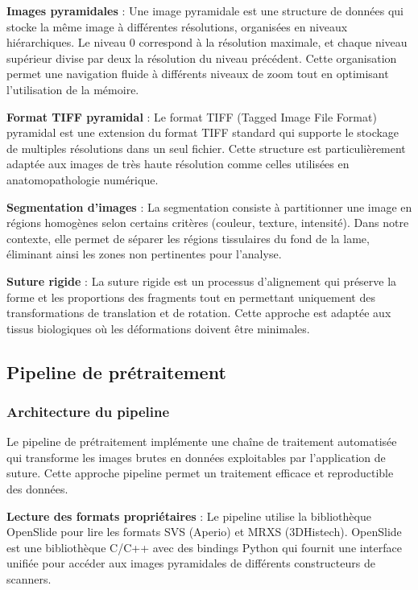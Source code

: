 \documentclass[12pt,a4paper]{report}
\begin{document}
\textbf{Images pyramidales} : Une image pyramidale est une structure de données qui stocke la même image à différentes résolutions, organisées en niveaux hiérarchiques. Le niveau 0 correspond à la résolution maximale, et chaque niveau supérieur divise par deux la résolution du niveau précédent. Cette organisation permet une navigation fluide à différents niveaux de zoom tout en optimisant l'utilisation de la mémoire.

\textbf{Format TIFF pyramidal} : Le format TIFF (Tagged Image File Format) pyramidal est une extension du format TIFF standard qui supporte le stockage de multiples résolutions dans un seul fichier. Cette structure est particulièrement adaptée aux images de très haute résolution comme celles utilisées en anatomopathologie numérique.

\textbf{Segmentation d'images} : La segmentation consiste à partitionner une image en régions homogènes selon certains critères (couleur, texture, intensité). Dans notre contexte, elle permet de séparer les régions tissulaires du fond de la lame, éliminant ainsi les zones non pertinentes pour l'analyse.

\textbf{Suture rigide} : La suture rigide est un processus d'alignement qui préserve la forme et les proportions des fragments tout en permettant uniquement des transformations de translation et de rotation. Cette approche est adaptée aux tissus biologiques où les déformations doivent être minimales.

\subsection{Pipeline de prétraitement}

\subsubsection{Architecture du pipeline}

Le pipeline de prétraitement implémente une chaîne de traitement automatisée qui transforme les images brutes en données exploitables par l'application de suture. Cette approche pipeline permet un traitement efficace et reproductible des données.

\textbf{Lecture des formats propriétaires} : Le pipeline utilise la bibliothèque OpenSlide pour lire les formats SVS (Aperio) et MRXS (3DHistech). OpenSlide est une bibliothèque C/C++ avec des bindings Python qui fournit une interface unifiée pour accéder aux images pyramidales de différents constructeurs de scanners.
\end{document}
